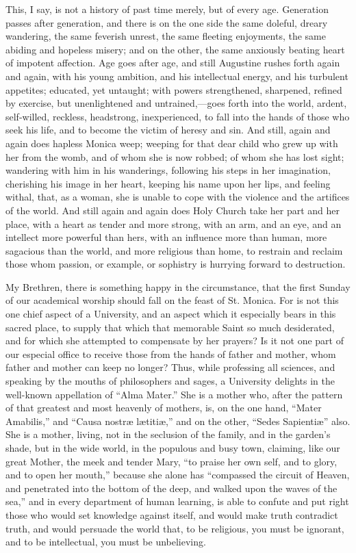 This, I say, is not a history of past time merely, but
of every age. Generation passes after generation, and
there is on the one side the same doleful, dreary
wandering, the same feverish unrest, the same fleeting
enjoyments, the same abiding and hopeless misery; and on
the other, the same anxiously beating heart of impotent
affection. Age goes after age, and still Augustine rushes
forth again and again, with his young ambition, and his
intellectual energy, and his turbulent appetites;
educated, yet untaught; with powers strengthened,
sharpened, refined by exercise, but unenlightened and
untrained,—goes forth into the world, ardent,
self-willed, reckless, headstrong, inexperienced, to fall
into the hands of those who seek his life, and to become
the victim of heresy and sin. And still, again and again
does hapless Monica weep; weeping for that dear child who
grew up with her from the womb, and of whom she is now
robbed; of whom she has lost sight; wandering with him in
his wanderings, following his steps in her imagination,
cherishing his image in her heart, keeping his name upon
her lips, and feeling withal, that, as a woman, she is
unable to cope with the violence and the artifices of the
world. And still again and again does Holy Church take
her part and her place, with a heart as tender and more
strong, with an arm, and an eye, and an intellect more
powerful than hers, with an influence more than human,
more sagacious than the world, and more religious than
home, to restrain and reclaim those whom passion, or
example, or sophistry is hurrying forward to destruction.

My Brethren, there is something happy in the
circumstance, that the first Sunday of our academical
worship should fall on the feast of St. Monica. For is
not this one chief aspect of a University, and an aspect
which it especially bears in this sacred place, to supply
that which that memorable Saint so much desiderated, and
for which she attempted to compensate by her prayers? Is
it not one part of our especial office to receive those
from the hands of father and mother, whom father and
mother can keep no longer? Thus, while professing all
sciences, and speaking by the mouths of philosophers and
sages, a University delights in the well-known
appellation of ``Alma Mater.'' She is a mother
who, after the pattern of that greatest and most heavenly
of mothers, is, on the one hand, ``Mater
Amabilis,'' and ``Causa nostræ lætitiæ,''
and on the other, ``Sedes Sapientiæ'' also. She
is a mother, living, not in the seclusion of the family,
and in the garden's shade, but in the wide world, in the
populous and busy town, claiming, like our great Mother,
the meek and tender Mary, ``to praise her own self,
and to glory, and to open her mouth,'' because she
alone has ``compassed the circuit of Heaven, and
penetrated into the bottom of the deep, and walked upon
the waves of the sea,'' and in every department of
human learning, is able to confute and put right those
who would set knowledge against itself, and would make
truth contradict truth, and would persuade the world
that, to be religious, you must be ignorant, and to be
intellectual, you must be unbelieving.

